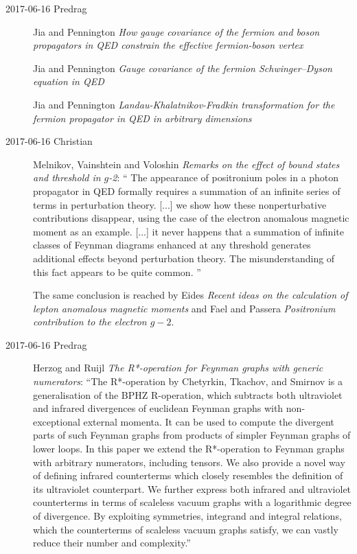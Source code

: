 \begin{description}
\item[2017-06-16 Predrag]

Jia and Pennington
{\em How gauge covariance of the fermion and boson propagators in {QED}
constrain the effective fermion-boson vertex}

Jia and Pennington
{\em Gauge covariance of the fermion {Schwinger–Dyson} equation in {QED}}

Jia and Pennington
{\em Landau-Khalatnikov-Fradkin transformation for the fermion propagator
in QED in arbitrary dimensions}

\item[2017-06-16 Christian]
Melnikov, Vainshtein and Voloshin
{\em Remarks on the effect of bound states and threshold in $g$-2}:
``
The appearance of positronium poles in a photon propagator in QED
formally requires a summation of an infinite series of terms in
perturbation theory. [...] we show how these nonperturbative
contributions disappear, using the case of the electron anomalous
magnetic moment as an example. [...] it never happens that a summation of
infinite classes of Feynman diagrams enhanced at any threshold generates
additional effects beyond perturbation theory. The misunderstanding of
this fact appears to be quite common.
''

The same conclusion is reached by
Eides
{\em Recent ideas on the calculation of lepton anomalous magnetic moments}
and
Fael and Passera
{\em Positronium contribution to the electron {$g-2$}}.

\item[2017-06-16 Predrag]
Herzog and Ruijl
{\em The {R*}-operation for {Feynman} graphs with generic numerators}:
``The R*-operation by Chetyrkin, Tkachov, and Smirnov is a generalisation
of the BPHZ R-operation, which subtracts both ultraviolet and infrared
divergences of euclidean Feynman graphs with non-exceptional external
momenta. It can be used to compute the divergent parts of such Feynman
graphs from products of simpler Feynman graphs of lower loops. In this
paper we extend the R*-operation to Feynman graphs with arbitrary
numerators, including tensors. We also provide a novel way of defining
infrared counterterms which closely resembles the definition of its
ultraviolet counterpart. We further express both infrared and ultraviolet
counterterms in terms of scaleless vacuum graphs with a logarithmic
degree of divergence. By exploiting symmetries, integrand and integral
relations, which the counterterms of scaleless vacuum graphs satisfy, we
can vastly reduce their number and complexity.''


\end{description}
